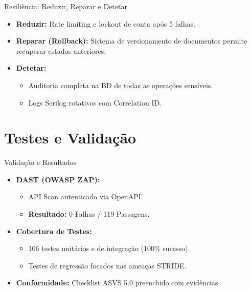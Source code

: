 \documentclass[aspectratio=169]{beamer}
\begin{document}
\begin{frame}{Resiliência: Reduzir, Reparar e Detetar}
    \begin{itemize}
        \item \textbf{Reduzir:} Rate limiting e lockout de conta após 5 falhas.
        \item \textbf{Reparar (Rollback):} Sistema de versionamento de documentos permite recuperar estados anteriores.
        \item \textbf{Detetar:} 
        \begin{itemize}
            \item Auditoria completa na BD de todas as operações sensíveis.
            \item Logs Serilog rotativos com Correlation ID.
        \end{itemize}
    \end{itemize}
\end{frame}

\section{Testes e Validação}
\begin{frame}{Validação e Resultados}
    \begin{itemize}
        \item \textbf{DAST (OWASP ZAP):} 
        \begin{itemize}
            \item API Scan autenticado via OpenAPI.
            \item \textbf{Resultado:} 0 Falhas / 119 Passagens.
        \end{itemize}
        \item \textbf{Cobertura de Testes:}
        \begin{itemize}
            \item 106 testes unitários e de integração (100\% sucesso).
            \item Testes de regressão focados nas ameaças STRIDE.
        \end{itemize}
        \item \textbf{Conformidade:} Checklist ASVS 5.0 preenchido com evidências.
    \end{itemize}
\end{frame}
\end{document}
